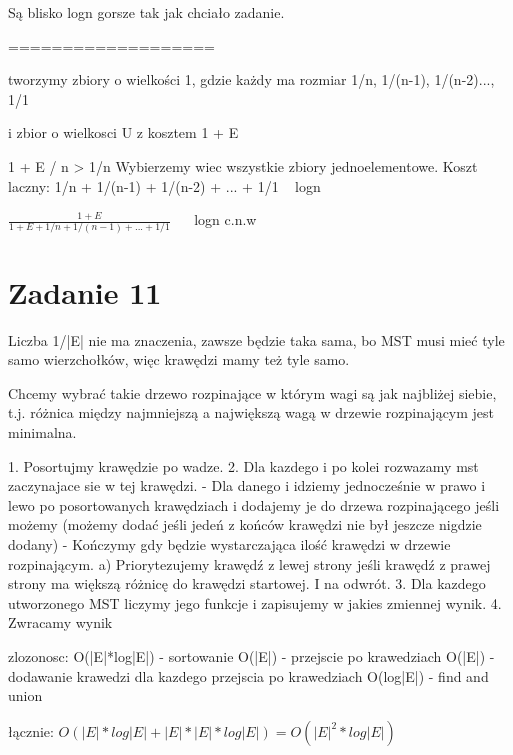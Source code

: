 \documentclass[12pt]{article}
\begin{document}
Są blisko logn gorsze tak jak chciało zadanie.




===================


tworzymy zbiory o wielkości 1, gdzie każdy ma rozmiar 1/n, 1/(n-1), 1/(n-2)..., 1/1 

i zbior o wielkosci U z kosztem 1 + E 

1 + E / n > 1/n 
Wybierzemy wiec wszystkie zbiory jednoelementowe. Koszt laczny:
1/n + 1/(n-1) + 1/(n-2) + ... + 1/1 ~ logn 


$\frac{1+E}{1 + E + 1/n + 1/(n-1) + ... + 1/1}$ ~~ logn c.n.w



\section{Zadanie 11}
Liczba 1/|E| nie ma znaczenia, zawsze będzie taka sama, bo MST musi mieć tyle samo wierzchołków, więc krawędzi mamy też tyle samo. 






Chcemy wybrać takie drzewo rozpinające w którym wagi są jak najbliżej siebie, t.j. różnica między najmniejszą a największą wagą w drzewie rozpinającym jest minimalna.


1. Posortujmy krawędzie po wadze. 
2. Dla kazdego i po kolei rozwazamy mst zaczynajace sie w tej krawędzi. 
- Dla danego i idziemy jednocześnie w prawo i lewo po posortowanych krawędziach i dodajemy je do drzewa rozpinającego jeśli możemy (możemy dodać jeśli jedeń z końców krawędzi nie był jeszcze nigdzie dodany)
- Kończymy gdy będzie wystarczająca ilość krawędzi w drzewie rozpinającym.
a) Priorytezujemy krawędź z lewej strony jeśli krawędź z prawej strony ma większą różnicę do krawędzi startowej. I na odwrót.
3. Dla kazdego utworzonego MST liczymy jego funkcje i zapisujemy w jakies zmiennej wynik.
4. Zwracamy wynik

zlozonosc:
O(|E|*log|E|) - sortowanie
O(|E|) - przejscie po krawedziach
O(|E|) - dodawanie krawedzi dla kazdego przejscia po krawedziach 
O(log|E|) - find and union 

łącznie:
$O(|E|*log|E| + |E|*|E|*log|E|) = O(|E|^2*log|E|)$
\end{document}
